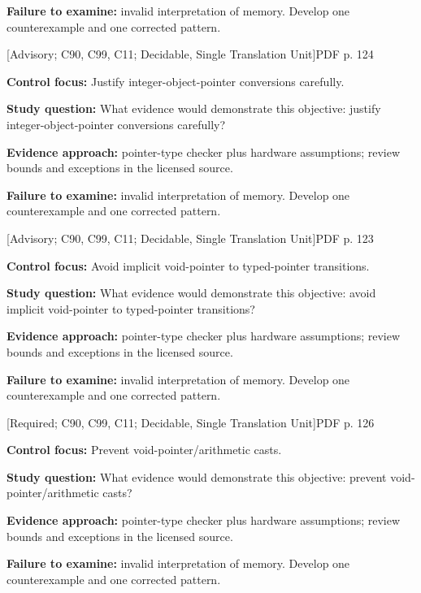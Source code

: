 \documentclass[10pt,letterpaper]{article}
\begin{document}
\textbf{Failure to examine:} invalid interpretation of memory. Develop one counterexample and one corrected pattern.\par
\smallskip
{}
 \textsf{\footnotesize [Advisory; C90, C99, C11; Decidable, Single Translation Unit]}\hfill{\footnotesize PDF p. 124}\par
\textbf{Control focus:} Justify integer-object-pointer conversions carefully.\par
\textbf{Study question:} What evidence would demonstrate this objective: justify integer-object-pointer conversions carefully?\par
\textbf{Evidence approach:} pointer-type checker plus hardware assumptions; review bounds and exceptions in the licensed source.\par
\textbf{Failure to examine:} invalid interpretation of memory. Develop one counterexample and one corrected pattern.\par
\smallskip
{}
 \textsf{\footnotesize [Advisory; C90, C99, C11; Decidable, Single Translation Unit]}\hfill{\footnotesize PDF p. 123}\par
\textbf{Control focus:} Avoid implicit void-pointer to typed-pointer transitions.\par
\textbf{Study question:} What evidence would demonstrate this objective: avoid implicit void-pointer to typed-pointer transitions?\par
\textbf{Evidence approach:} pointer-type checker plus hardware assumptions; review bounds and exceptions in the licensed source.\par
\textbf{Failure to examine:} invalid interpretation of memory. Develop one counterexample and one corrected pattern.\par
\smallskip
{}
 \textsf{\footnotesize [Required; C90, C99, C11; Decidable, Single Translation Unit]}\hfill{\footnotesize PDF p. 126}\par
\textbf{Control focus:} Prevent void-pointer/arithmetic casts.\par
\textbf{Study question:} What evidence would demonstrate this objective: prevent void-pointer/arithmetic casts?\par
\textbf{Evidence approach:} pointer-type checker plus hardware assumptions; review bounds and exceptions in the licensed source.\par
\textbf{Failure to examine:} invalid interpretation of memory. Develop one counterexample and one corrected pattern.\par
\end{document}
